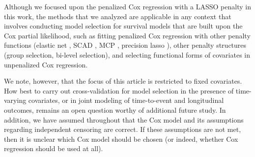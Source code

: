 Although we focused upon the penalized Cox regression with a LASSO penalty in this work, the methods that we analyzed are applicable in any context that involves conducting model selection for survival models that are built upon the Cox partial likelihood, such as fitting penalized Cox regression with other penalty functions (elastic net \citep{Zou2005}, SCAD \citep{FanLi2001}, MCP \citep{Zhang2010}, precision lasso \citep{Wang2018}), other penalty structures (group selection, bi-level selection), and selecting functional forms of covariates in unpenalized Cox regression.

We note, however, that the focus of this article is restricted to fixed covariates. How best to carry out cross-validation for model selection in the presence of time-varying covariates, or in joint modeling of time-to-event and longitudinal outcomes, remains an open question worthy of additional future study. In addition, we have assumed throughout that the Cox model and its assumptions regarding independent censoring are correct. If these assumptions are not met, then it is unclear which Cox model should be chosen (or indeed, whether Cox regression should be used at all).




